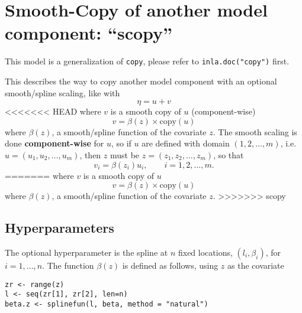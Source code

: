 \documentclass[a4paper,11pt]{article}
\begin{document}
\section*{Smooth-Copy of another model component: ``scopy''}

This model is a generalization of \texttt{copy}, please refer to
\texttt{inla.doc("copy")} first.

This describes the way to copy another model component with an
optional smooth/spline scaling, like with
\begin{displaymath}
    \eta = u + v
\end{displaymath}
<<<<<<< HEAD
where $v$ is a smooth copy of $u$ (component-wise)
\begin{displaymath}
    v = \beta(z)\times\text{copy}(u)
\end{displaymath}
where $\beta(z)$, a smooth/spline function of the covariate $z$. The
smooth scaling is done \textbf{component-wise} for $u$, so if $u$ are
defined with domain $(1, 2, \ldots, m)$, i.e.\
$u=(u_1, u_2, \ldots, u_m)$, then $z$ must be
$z=(z_1, z_2, \ldots, z_m)$, so that
\begin{displaymath}
    v_i = \beta(z_i) u_i, \qquad i=1, 2, \ldots, m.
\end{displaymath}
=======
where $v$ is a smooth copy of $u$
\begin{displaymath}
    v = \beta(z)\times\text{copy}(u)
\end{displaymath}
where $\beta(z)$, a smooth/spline function of the covariate $z$.
>>>>>>> scopy

\subsection*{Hyperparameters}

The optional hyperparameter is the spline at $n$ fixed locations,
$(l_i, \beta_i)$, for $i=1, \ldots, n$. The function $\beta(z)$ is
defined as follows, using $z$ as the covariate
\begin{verbatim}
zr <- range(z)
l <- seq(zr[1], zr[2], len=n)
beta.z <- splinefun(l, beta, method = "natural")
\end{verbatim}
\end{document}
